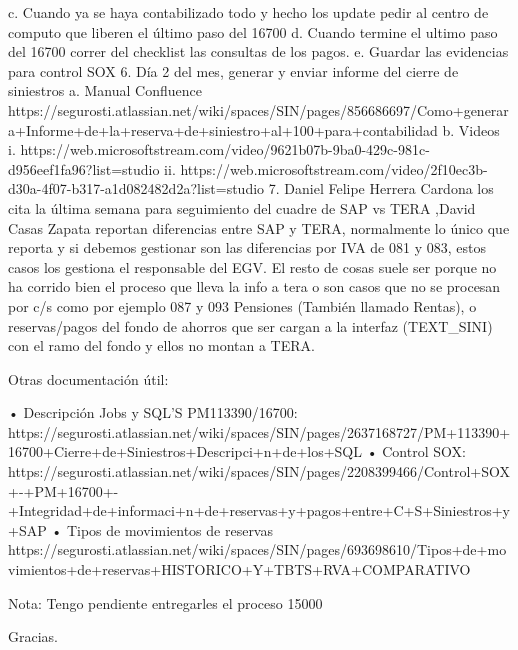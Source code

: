 		c. Cuando ya se haya contabilizado todo y hecho los update pedir al centro de computo que liberen el último paso del 16700
		d. Cuando termine el ultimo paso del 16700 correr del checklist las consultas de los pagos.
		e. Guardar las evidencias para control SOX
	6. Día 2 del mes, generar y enviar informe del cierre de siniestros
		a. Manual Confluence https://segurosti.atlassian.net/wiki/spaces/SIN/pages/856686697/Como+generara+Informe+de+la+reserva+de+siniestro+al+100+para+contabilidad
		b. Videos
                                                    i.     https://web.microsoftstream.com/video/9621b07b-9ba0-429c-981c-d956eef1fa96?list=studio
                                                   ii.     https://web.microsoftstream.com/video/2f10ec3b-d30a-4f07-b317-a1d082482d2a?list=studio
	7. Daniel Felipe Herrera Cardona los cita la última semana para seguimiento del cuadre de SAP vs TERA ,David Casas Zapata reportan diferencias entre SAP y TERA, normalmente lo único que reporta y si debemos gestionar son las diferencias por IVA de 081 y 083, estos casos los gestiona el responsable del EGV. El resto de cosas suele ser porque no ha corrido bien el proceso que lleva la info a tera o son casos que no se procesan por c/s como por ejemplo 087 y 093 Pensiones (También llamado Rentas), o reservas/pagos del fondo de ahorros que ser cargan a la interfaz (TEXT_SINI) con el ramo del fondo y ellos no montan a TERA.
               
Otras documentación útil:
 
	• Descripción Jobs y SQL’S PM113390/16700: https://segurosti.atlassian.net/wiki/spaces/SIN/pages/2637168727/PM+113390+16700+Cierre+de+Siniestros+Descripci+n+de+los+SQL
	• Control SOX: https://segurosti.atlassian.net/wiki/spaces/SIN/pages/2208399466/Control+SOX+-+PM+16700+-+Integridad+de+informaci+n+de+reservas+y+pagos+entre+C+S+Siniestros+y+SAP
	• Tipos de movimientos de reservas https://segurosti.atlassian.net/wiki/spaces/SIN/pages/693698610/Tipos+de+movimientos+de+reservas+HISTORICO+Y+TBTS+RVA+COMPARATIVO
 
Nota: Tengo pendiente entregarles el proceso 15000
 
Gracias.
